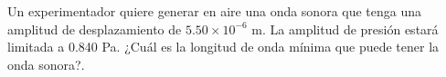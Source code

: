\item Un experimentador quiere generar en aire una onda sonora que tenga una amplitud de desplazamiento de $5.50 \times 10^{-6}\text{ m}$. La amplitud de presión estará limitada a 0.840 Pa. ¿Cuál es la longitud de onda mínima que puede tener la onda sonora?.